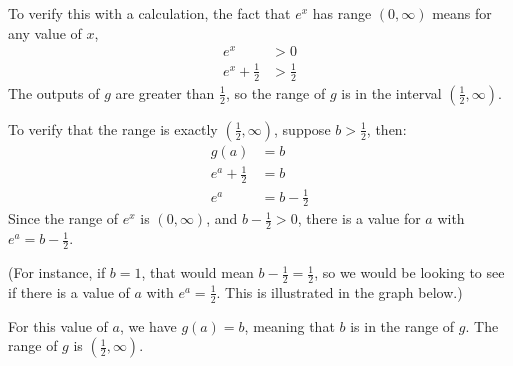 \documentclass[nooutcomes]{ximera}
\begin{document}
\begin{example}
\begin{explanation}
\begin{enumerate}
					To verify this with a calculation, the fact that $e^x$ has range $(0,\infty)$ means for any value of $x$,
					\begin{align*}
						e^x &> 0\\
						e^x + \frac{1}{2} &> \frac{1}{2}
					\end{align*}
					The outputs of $g$ are greater than $\frac{1}{2}$, so the range of $g$ is in the interval	$\left( \frac{1}{2}, \infty\right)$.
					
					To verify that the range is exactly $\left( \frac{1}{2}, \infty\right)$, suppose $b > \frac{1}{2}$, then:
					\begin{align*}
						g(a) &= b\\
						e^a + \frac{1}{2} &= b\\
						e^a & = b-\frac{1}{2}
					\end{align*}
					Since the range of $e^x$ is $(0, \infty)$, and $b-\frac{1}{2} > 0$, there is a value for $a$ with $e^a = b-\frac{1}{2}$.
					
					(For instance, if $b=1$, that would mean $b-\frac{1}{2} = \frac{1}{2}$, so we would be looking to see if there is a value of $a$  with $e^a = \frac{1}{2}$. This is 
					illustrated in the graph below.)
					\begin{image}
					\end{image}
					
					For this value of $a$, we have $g\left( a \right) = b$, meaning that $b$ is in the range of $g$.
					The range of $g$ is $\left( \frac{1}{2}, \infty\right)$.


\end{enumerate}
\end{explanation}
\end{example}
\end{document}
